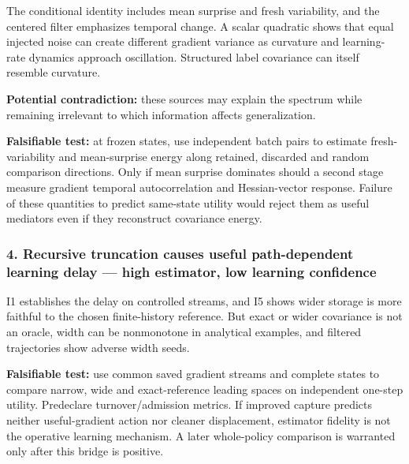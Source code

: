 \documentclass[
  british,
  10pt,
  a4paper,
]{article}
\begin{document}
The conditional identity includes mean surprise and fresh
variability,\allowbreak{} and the centered filter emphasizes temporal
change. A scalar quadratic shows that equal injected noise can create
different gradient variance as curvature and learning-\allowbreak{}rate
dynamics approach oscillation.\allowbreak{} Structured label covariance
can itself resemble curvature.

\textbf{Potential contradiction:} these sources may explain the spectrum
while remaining irrelevant to which information affects
generalizati\allowbreak{}on.\allowbreak{}

\textbf{Falsifiable test:} at frozen states, use independent batch pairs
to estimate fresh-\allowbreak{}variability and
mean-\allowbreak{}surprise energy along retained, discarded and random
comparison directions.\allowbreak{} Only if mean surprise dominates
should a second stage measure gradient temporal autocorrelation and
Hessian-\allowbreak{}vector response. Failure of these quantities to
predict same-state utility would reject them as useful mediators even if
they reconstruct covariance energy.

\subsubsection{\texorpdfstring{4. Recursive truncation causes useful
path-\allowbreak{}dependent learning delay --- high estimator, low
learning
confidence}{4. Recursive truncation causes useful  learning delay --- high estimator, low learning confidence}}\label{synthesis--recursive-truncation-causes-useful-path-dependent-learning-delay-high-estimator-low-learning-confidence}

I1 establishes the delay on controlled streams, and I5 shows wider
storage is more faithful to the chosen finite-\allowbreak{}history
reference. But exact or wider covariance is not an oracle, width can be
nonmonotone in analytical examples, and filtered trajectories show
adverse width seeds.

\textbf{Falsifiable test:} use common saved gradient streams and
complete states to compare narrow, wide and exact-\allowbreak{}reference
leading spaces on independent one-step utility. Predeclare
turnover/\allowbreak{}admission metrics. If improved capture predicts
neither useful-\allowbreak{}gradient action nor cleaner
displacement\allowbreak{},\allowbreak{} estimator fidelity is not the
operative learning mechanism. A later whole-\allowbreak{}policy
comparison is warranted only after this bridge is positive.
\end{document}
